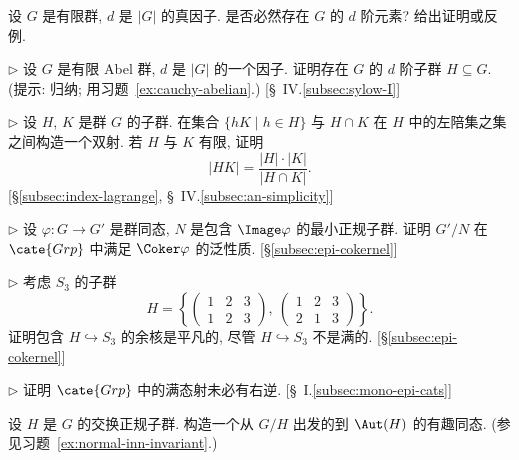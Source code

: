\begin{prob}
\label{ex:element-order-d}
设 $G$ 是有限群, $d$ 是 $|G|$ 的真因子. 是否必然存在 $G$ 的 $d$ 阶元素? 给出证明或反例.
\end{prob}

\begin{prob}
\label{ex:subgroup-order-d}
$\triangleright$ 设 $G$ 是有限 Abel 群, $d$ 是 $|G|$ 的一个因子. 证明存在 $G$ 的 $d$ 阶子群 $H \subseteq G$. (提示: 归纳; 用习题~\ref{ex:cauchy-abelian}.) [\S~IV.\ref{subsec:sylow-I}]
\end{prob}

\begin{prob}
\label{ex:HK-formula}
$\triangleright$ 设 $H$, $K$ 是群 $G$ 的子群. 在集合 $\{hK \mid h \in H\}$ 与 $H \cap K$ 在 $H$ 中的左陪集之集之间构造一个双射. 若 $H$ 与 $K$ 有限, 证明
\[
|HK| = \frac{|H| \cdot |K|}{|H \cap K|}.
\]
[\S\ref{subsec:index-lagrange}, \S~IV.\ref{subsec:an-simplicity}]
\end{prob}

\begin{prob}
\label{ex:cokernel-grp}
$\triangleright$ 设 $\varphi : G \to G'$ 是群同态, $N$ 是包含 $\Image \varphi$ 的最小正规子群. 证明 $G'/N$ 在 $\cate{Grp}$ 中满足 $\Coker \varphi$ 的泛性质. [\S\ref{subsec:epi-cokernel}]
\end{prob}

\begin{prob}
\label{ex:coker-trivial}
$\triangleright$ 考虑 $S_3$ 的子群
\[
H = \left\{ \begin{pmatrix} 1 & 2 & 3 \\ 1 & 2 & 3 \end{pmatrix},\ \begin{pmatrix} 1 & 2 & 3 \\ 2 & 1 & 3 \end{pmatrix} \right\}.
\]
证明包含 $H \hookrightarrow S_3$ 的余核是平凡的, 尽管 $H \hookrightarrow S_3$ 不是满的. [\S\ref{subsec:epi-cokernel}]
\end{prob}

\begin{prob}
\label{ex:epi-no-section}
$\triangleright$ 证明 $\cate{Grp}$ 中的满态射未必有右逆. [\S~I.\ref{subsec:mono-epi-cats}]
\end{prob}

\begin{prob}
\label{ex:normal-to-aut}
设 $H$ 是 $G$ 的交换正规子群. 构造一个从 $G/H$ 出发的到 $\Aut(H)$ 的有趣同态. (参见习题~\ref{ex:normal-inn-invariant}.)
\end{prob}

